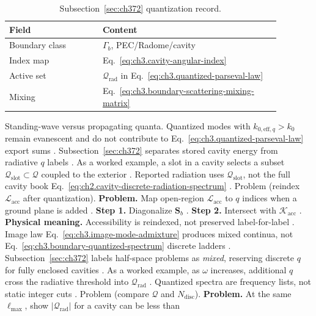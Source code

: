 \begin{table}[t]
\centering
\caption{Subsection~\ref{sec:ch372} quantization record.}
\label{tab:ch3.372-quantization-metadata}
\small
\begin{tabular}{@{}p{0.30\linewidth}p{0.58\linewidth}@{}}
\toprule
Field & Content \\
\midrule
Boundary class & \(\Gamma_{b}\), PEC/Radome/cavity \\
Index map & Eq.~\eqref{eq:ch3.cavity-angular-index} \\
Active set & \(\mathcal{Q}_{\mathrm{rad}}\) in Eq.~\eqref{eq:ch3.quantized-parseval-law} \\
Mixing & Eq.~\eqref{eq:ch3.boundary-scattering-mixing-matrix} \\
\bottomrule
\end{tabular}
\end{table}
Standing-wave versus propagating quanta. Quantized modes with \(k_{0,\mathrm{eff},q}>k_{0}\) remain evanescent and do not contribute to
Eq.~\eqref{eq:ch3.quantized-parseval-law} export sums \cite{stratton1941}. Subsection~\ref{sec:ch372} separates
stored cavity energy from radiative \(q\) labels \cite{harrington2001}.
As a worked example, a slot in a cavity selects a subset \(\mathcal{Q}_{\mathrm{slot}}\subset\mathcal{Q}\) coupled to the exterior
\cite{harrington2001}. Reported radiation uses \(\mathcal{Q}_{\mathrm{slot}}\), not the full cavity book
Eq.~\eqref{eq:ch2.cavity-discrete-radiation-spectrum} \cite{jackson1999}.
Problem (reindex \(\mathcal{L}_{\mathrm{acc}}\) after quantization). \textbf{Problem.} Map open-region \(\mathcal{L}_{\mathrm{acc}}\) to \(q\) indices when a ground plane is added
\cite{harrington2001}.
\textbf{Step 1.} Diagonalize \(\mathbf{S}_{b}\) \cite{hansen1988}.
\textbf{Step 2.} Intersect with \(\mathcal{K}_{\mathrm{acc}}\) \cite{stratton1941}.
\textbf{Physical meaning.} Accessibility is reindexed, not preserved label-for-label \cite{harrington2001}.
Image law Eq.~\eqref{eq:ch3.image-mode-admixture} produces mixed continua, not Eq.~\eqref{eq:ch3.boundary-quantized-spectrum}
discrete ladders \cite{jackson1999}. Subsection~\ref{sec:ch372} labels half-space problems as
\emph{mixed}, reserving discrete \(q\) for fully enclosed cavities \cite{harrington2001}.
As a worked example, as \(\omega\) increases, additional \(q\) cross the radiative threshold into \(\mathcal{Q}_{\mathrm{rad}}\)
\cite{jackson1999}. Quantized spectra are frequency lists, not static integer cuts \cite{harrington2001}.
Problem (compare \(\mathcal{Q}\) and \(N_{\mathrm{disc}}\)). \textbf{Problem.} At the same \(\ell_{\max}\), show \(|\mathcal{Q}_{\mathrm{rad}}|\) for a cavity can be less than
